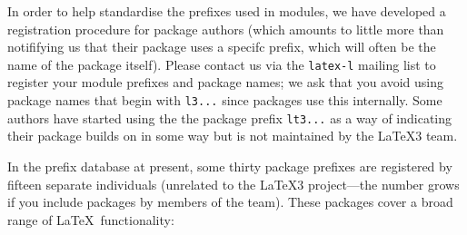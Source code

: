 \documentclass{ltnews}
\begin{document}
In order to help standardise the prefixes used in  modules, we have developed a registration procedure for package authors (which amounts to little more than notififying us that their package uses a specifc prefix, which will often be the name of the package itself).
Please contact us via the \texttt{latex-l} mailing list to register your module prefixes and package names; we ask that you avoid using package names that begin with \texttt{l3...} since  packages use this internally.
Some authors have started using the the package prefix \texttt{lt3...} as a way of indicating their package builds on  in some way but is not maintained by the \LaTeX3 team.

In the prefix database at present, some thirty package prefixes are registered by fifteen separate individuals (unrelated to the \LaTeX3 project---the number grows if you include packages by members of the team).
These packages cover a broad range of \LaTeX\ functionality:
\end{document}
